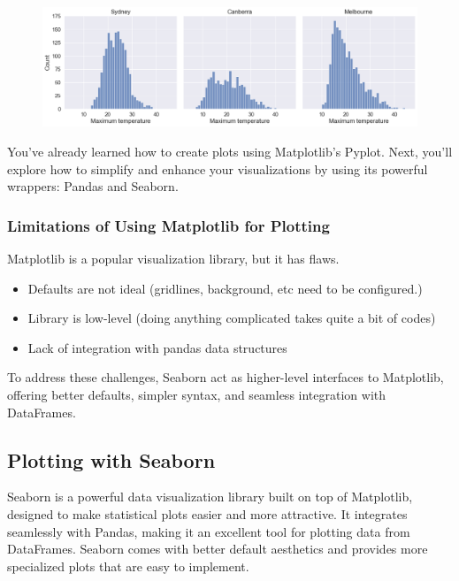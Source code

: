 \documentclass[
  letterpaper,
  DIV=11,
  numbers=noendperiod]{scrreprt}
\providecommand{\tightlist}{%
  \setlength{\itemsep}{0pt}\setlength{\parskip}{0pt}}\usepackage{longtable,booktabs,array}
\begin{document}
\begin{figure}[H]

{\centering \includegraphics{Data visualization_files/figure-pdf/cell-36-output-1.png}

}

\end{figure}

You've already learned how to create plots using Matplotlib's Pyplot.
Next, you'll explore how to simplify and enhance your visualizations by
using its powerful wrappers: Pandas and Seaborn.

\hypertarget{limitations-of-using-matplotlib-for-plotting}{%
\subsubsection{Limitations of Using Matplotlib for
Plotting}\label{limitations-of-using-matplotlib-for-plotting}}

Matplotlib is a popular visualization library, but it has flaws.

\begin{itemize}
\tightlist
\item
  Defaults are not ideal (gridlines, background, etc need to be
  configured.)
\item
  Library is low-level (doing anything complicated takes quite a bit of
  codes)
\item
  Lack of integration with pandas data structures
\end{itemize}

To address these challenges, Seaborn act as higher-level interfaces to
Matplotlib, offering better defaults, simpler syntax, and seamless
integration with DataFrames.

\hypertarget{plotting-with-seaborn}{%
\subsection{Plotting with Seaborn}\label{plotting-with-seaborn}}

Seaborn is a powerful data visualization library built on top of
Matplotlib, designed to make statistical plots easier and more
attractive. It integrates seamlessly with Pandas, making it an excellent
tool for plotting data from DataFrames. Seaborn comes with better
default aesthetics and provides more specialized plots that are easy to
implement.
\end{document}
